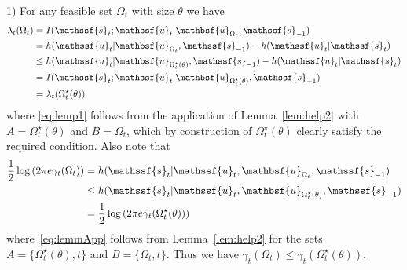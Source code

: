 \documentclass[journal, twocolumn, 10pt]{IEEEtran}
\newcommand{\rvs}{{\mathssf{s}}}    %
\newcommand{\rvu}{{\mathssf{u}}}    %
\newcommand{\rvbu}{{\mathbsf{u}}}
\begin{document}
{1) For any feasible set  $\Omega_t$ with size $\theta$ we have
\begin{align}
\lambda_{t}(\Omega_t) &= I(\rvs_{t}; \rvu_{t} | \rvbu_{\Omega_t}, \rvs_{-1})\notag\\
&=  h(\rvu_{t} | \rvbu_{\Omega_t}, \rvs_{-1})- h( \rvu_{t} | \rvs_{t})\notag\\
& \le h(\rvu_{t} | \rvbu_{\Omega^{\star}_t(\theta)}, \rvs_{-1})- h( \rvu_{t} | \rvs_{t})\label{eq:lemp1}\\
& = I(\rvs_{t}; \rvu_{t} | \rvbu_{\Omega^{\star}_t(\theta)}, \rvs_{-1}) \notag\\
& = \lambda_{t}(\Omega^{\star}_t(\theta)) \end{align} 
where \eqref{eq:lemp1} follows from the application of Lemma~\ref{lem:help2} with $A = \Omega^\star_t(\theta)$ and $B=\Omega_t$, which by construction of $\Omega^\star_t(\theta)$ clearly satisfy the required condition. Also note that 
\begin{align}
\frac{1}{2}\log\left(2 \pi e \gamma_{t}(\Omega_t)\right) &=  h (\rvs_{t} | \rvu_{t}, \rvbu_{\Omega_t}, \rvs_{-1})\notag\\
& \le h (\rvs_{t} | \rvu_{t}, \rvbu_{\Omega^{\star}_{t}(\theta)}, \rvs_{-1})\label{eq:lemmApp}\\
& =  \frac{1}{2}\log\left(2 \pi e \gamma_{t}(\Omega^{\star}_t(\theta))\right) 
\end{align} where~\eqref{eq:lemmApp} follows from Lemma~\ref{lem:help2} for the sets $A=\{\Omega^{\star}_{t}(\theta), t\}$ and $B= \{\Omega_t, t\}$. Thus we have $ \gamma_{t}(\Omega_t) \le \gamma_{t}(\Omega^{\star}_t(\theta))$.

}
\end{document}
